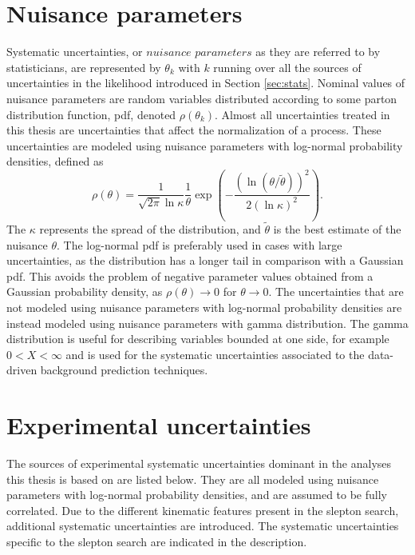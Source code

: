 \section{Nuisance parameters}
\noindent
\justify
Systematic uncertainties, or $nuisance$ $parameters$ as they are referred to by statisticians, are represented by $\theta_{k}$ with $k$ running over all the sources of uncertainties \cite{Lista:2016chp} in the likelihood introduced in Section \ref{sec:stats}.                                         
Nominal values of nuisance parameters are random variables distributed according to some parton distribution function, pdf, denoted $\rho(\theta_{k})$. 
Almost all uncertainties treated in this thesis are uncertainties that affect the normalization of a process. 
These uncertainties are modeled using nuisance parameters with log-normal probability densities, defined as
\begin{equation}
\rho(\theta)=\frac{1}{\sqrt{2\pi}\ln \kappa }\frac{1}{\theta}\exp\left(-\frac{(\ln(\theta/\tilde{\theta}))^{2}}{2(\ln \kappa)^{2}}\right).
\end{equation}   
The $\kappa$ represents the spread of the distribution, and $\tilde{\theta}$ is the best estimate of the nuisance $\theta$. 
The log-normal pdf is preferably used in cases with large uncertainties, as the distribution has a longer tail in comparison with a Gaussian pdf. 
This avoids the problem of negative parameter values obtained from a Gaussian probability density, as $\rho(\theta)\rightarrow0$ for $\theta\rightarrow0$.
The uncertainties that are not modeled using nuisance parameters with log-normal probability densities are instead modeled using nuisance parameters with gamma distribution.
The gamma distribution is useful for describing variables bounded at one side, for example $0<X<\infty$ and is used for the systematic uncertainties associated to the data-driven background prediction techniques. 
\section{Experimental uncertainties}
\noindent\justify
The sources of experimental systematic uncertainties dominant in the analyses this thesis is based on are listed below. They are all modeled using nuisance parameters with log-normal probability densities, and are assumed to be fully correlated. 
Due to the different kinematic features present in the slepton search, additional systematic uncertainties are introduced. 
The systematic uncertainties specific to the slepton search are indicated in the description. 
